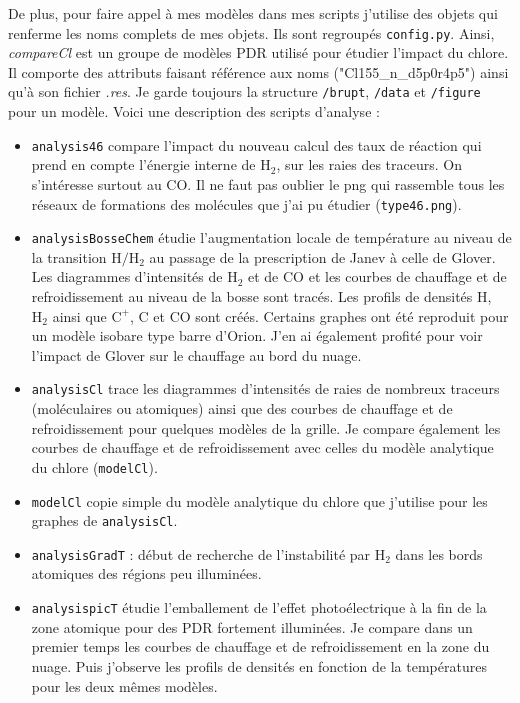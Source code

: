 \documentclass[11pt,a4paper,twoside,openright]{article}
\begin{document}
\begin{spacing}{0.98}
De plus, pour faire appel à mes modèles dans mes scripts j'utilise des objets qui renferme les noms complets de mes objets. Ils sont regroupés \texttt{config.py}. Ainsi, \textit{compareCl} est un groupe de modèles PDR utilisé pour étudier l'impact du chlore. Il comporte des attributs faisant référence aux noms ("Cl155\_n\_d5p0r4p5") ainsi qu'à son fichier \textit{.res}. Je garde toujours la structure \texttt{/brupt}, \texttt{/data} et \texttt{/figure} pour un modèle. Voici une description des scripts d'analyse :
\begin{itemize}
    \item \texttt{analysis46} compare l'impact du nouveau calcul des taux de réaction qui prend en compte l'énergie interne de $\mathrm{H}_2$, sur les raies des traceurs. On s'intéresse surtout au CO. Il ne faut pas oublier le png qui rassemble tous les réseaux de formations des molécules que j'ai pu étudier (\texttt{type46.png}).
    \item \texttt{analysisBosseChem} étudie l'augmentation locale de température au niveau de la transition $\mathrm{H}/\mathrm{H}_2$ au passage de la prescription de Janev à celle de Glover. Les diagrammes d'intensités de $\mathrm{H}_2$ et de $\mathrm{CO}$ et les courbes de chauffage et de refroidissement au niveau de la bosse sont tracés. Les profils de densités $\mathrm{H}$, $\mathrm{H}_2$ ainsi que $\mathrm{C}^+$, $\mathrm{C}$ et $\mathrm{CO}$ sont créés. Certains graphes ont été reproduit pour un modèle isobare type barre d'Orion. J'en ai également profité pour voir l'impact de Glover sur le chauffage au bord du nuage.
    \item \texttt{analysisCl} trace les diagrammes d'intensités de raies de nombreux traceurs (moléculaires ou atomiques) ainsi que des courbes de chauffage et de refroidissement pour quelques modèles de la grille. Je compare également les courbes de chauffage et de refroidissement avec celles du modèle analytique du chlore (\texttt{modelCl}).
    \item \texttt{modelCl} copie simple du modèle analytique du chlore que j'utilise pour les graphes de \texttt{analysisCl}. 
    \item \texttt{analysisGradT} : début de recherche de l'instabilité par $\mathrm{H}_2$ dans les bords atomiques des régions peu illuminées. 
    \item \texttt{analysispicT} étudie l'emballement de l'effet photoélectrique à la fin de la zone atomique pour des PDR fortement illuminées. Je compare dans un premier temps les courbes de chauffage et de refroidissement en la zone du nuage. Puis j'observe les profils de densités en fonction de la températures pour les deux mêmes modèles. 

\end{itemize}
\end{spacing}
\end{document}
